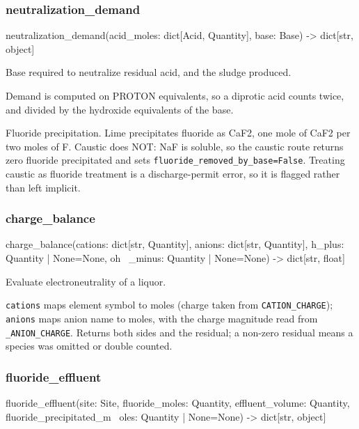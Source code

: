 \documentclass[10pt,a4paper,twoside]{report}
\begin{document}
\subsubsection*{neutralization\_demand}

\begin{verbatimsmall}
neutralization_demand(acid_moles: dict[Acid, Quantity], base: Base) -> dict[str, object]
\end{verbatimsmall}

Base required to neutralize residual acid, and the sludge produced.

Demand is computed on PROTON equivalents, so a diprotic acid counts twice, and divided by the hydroxide equivalents of the base.

Fluoride precipitation. Lime precipitates fluoride as CaF2, one mole of CaF2 per two moles of F. Caustic does NOT: NaF is soluble, so the caustic route returns zero fluoride precipitated and sets \texttt{fluoride\_removed\_by\_base=False}. Treating caustic as fluoride treatment is a discharge-permit error, so it is flagged rather than left implicit.

\subsubsection*{charge\_balance}

\begin{verbatimsmall}
charge_balance(cations: dict[str, Quantity], anions: dict[str, Quantity], h_plus: Quantity | None=None, oh
    \ _minus: Quantity | None=None) -> dict[str, float]
\end{verbatimsmall}

Evaluate electroneutrality of a liquor.

\texttt{cations} maps element symbol to moles (charge taken from \texttt{CATION\_CHARGE}); \texttt{anions} maps anion name to moles, with the charge magnitude read from \texttt{\_ANION\_CHARGE}. Returns both sides and the residual; a non-zero residual means a species was omitted or double counted.

\subsubsection*{fluoride\_effluent}

\begin{verbatimsmall}
fluoride_effluent(site: Site, fluoride_moles: Quantity, effluent_volume: Quantity, fluoride_precipitated_m
    \ oles: Quantity | None=None) -> dict[str, object]
\end{verbatimsmall}
\end{document}
